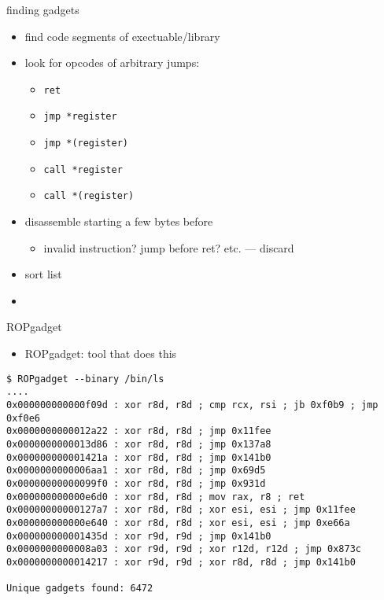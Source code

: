 
\begin{frame}{finding gadgets}
    \begin{itemize}
        \item find code segments of exectuable/library
        \item look for opcodes of arbitrary jumps:
            \begin{itemize}
            \item \texttt{ret}
            \item \texttt{jmp *register}
            \item \texttt{jmp *(register)}
            \item \texttt{call *register}
            \item \texttt{call *(register)}
        \end{itemize}
        \item disassemble starting a few bytes before
            \begin{itemize}
            \item invalid instruction? jump before ret? etc. --- discard
            \end{itemize}
        \item sort list
        \vspace{.5cm}
    \item {}
    \end{itemize}
\end{frame}

\begin{frame}[fragile,label=ROPgadgetEx1]{ROPgadget}
    \begin{itemize}
    \item ROPgadget: tool that does this
    \end{itemize}
\begin{lstlisting}[language={},style=small]
$ ROPgadget --binary /bin/ls
....
0x000000000000f09d : xor r8d, r8d ; cmp rcx, rsi ; jb 0xf0b9 ; jmp 0xf0e6
0x0000000000012a22 : xor r8d, r8d ; jmp 0x11fee
0x0000000000013d86 : xor r8d, r8d ; jmp 0x137a8
0x000000000001421a : xor r8d, r8d ; jmp 0x141b0
0x0000000000006aa1 : xor r8d, r8d ; jmp 0x69d5
0x00000000000099f0 : xor r8d, r8d ; jmp 0x931d
0x000000000000e6d0 : xor r8d, r8d ; mov rax, r8 ; ret
0x00000000000127a7 : xor r8d, r8d ; xor esi, esi ; jmp 0x11fee
0x000000000000e640 : xor r8d, r8d ; xor esi, esi ; jmp 0xe66a
0x000000000001435d : xor r9d, r9d ; jmp 0x141b0
0x0000000000008a03 : xor r9d, r9d ; xor r12d, r12d ; jmp 0x873c
0x0000000000014217 : xor r9d, r9d ; xor r8d, r8d ; jmp 0x141b0

Unique gadgets found: 6472
\end{lstlisting}
\end{frame}

